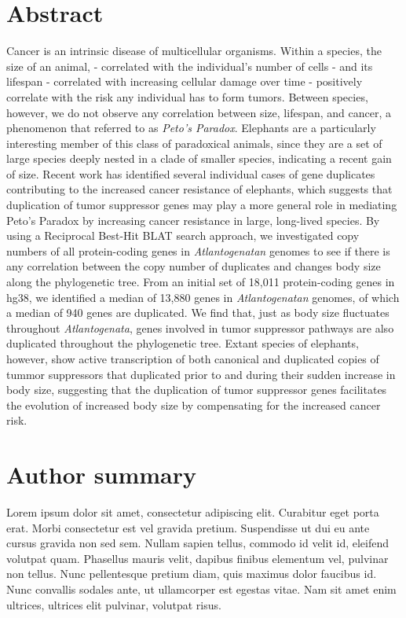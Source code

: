 \documentclass[10pt,letterpaper]{article}
\begin{document}
\section*{Abstract}
Cancer is an intrinsic disease of multicellular organisms. Within a
species, the size of an animal, - correlated with the individual's
number of cells - and its lifespan - correlated with increasing cellular
damage over time - positively correlate with the risk any individual has
to form tumors. Between species, however, we do not observe any
correlation between size, lifespan, and cancer, a phenomenon that
referred to as \emph{Peto's Paradox}. Elephants are a particularly
interesting member of this class of paradoxical animals, since they are
a set of large species deeply nested in a clade of smaller species,
indicating a recent gain of size. Recent work has identified several
individual cases of gene duplicates contributing to the increased cancer
resistance of elephants, which suggests that duplication of tumor
suppressor genes may play a more general role in mediating Peto's
Paradox by increasing cancer resistance in large, long-lived species. By
using a Reciprocal Best-Hit BLAT search approach, we investigated copy
numbers of all protein-coding genes in \emph{Atlantogenatan} genomes to
see if there is any correlation between the copy number of duplicates
and changes body size along the phylogenetic tree. From an initial set
of 18,011 protein-coding genes in hg38, we identified a median of 13,880
genes in \emph{Atlantogenatan} genomes, of which a median of 940 genes
are duplicated. We find that, just as body size fluctuates throughout
\emph{Atlantogenata}, genes involved in tumor suppressor pathways are
also duplicated throughout the phylogenetic tree. Extant species of
elephants, however, show active transcription of both canonical and
duplicated copies of tummor suppressors that duplicated prior to and
during their sudden increase in body size, suggesting that the
duplication of tumor suppressor genes facilitates the evolution of
increased body size by compensating for the increased cancer risk.

\section*{Author summary}
Lorem ipsum dolor sit amet, consectetur adipiscing elit. Curabitur eget
porta erat. Morbi consectetur est vel gravida pretium. Suspendisse ut
dui eu ante cursus gravida non sed sem. Nullam sapien tellus, commodo id
velit id, eleifend volutpat quam. Phasellus mauris velit, dapibus
finibus elementum vel, pulvinar non tellus. Nunc pellentesque pretium
diam, quis maximus dolor faucibus id. Nunc convallis sodales ante, ut
ullamcorper est egestas vitae. Nam sit amet enim ultrices, ultrices elit
pulvinar, volutpat risus.
\end{document}
